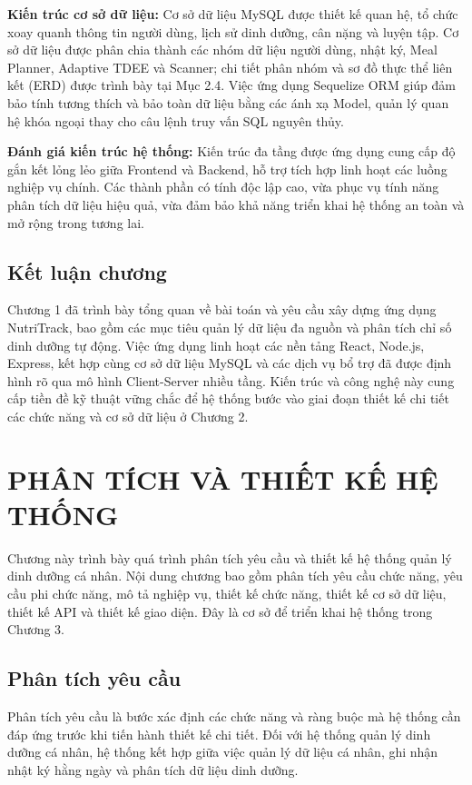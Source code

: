 \documentclass[12pt, a4paper]{report}
\begin{document}
\textbf{Kiến trúc cơ sở dữ liệu:} Cơ sở dữ liệu MySQL được thiết kế quan hệ, tổ chức xoay quanh thông tin người dùng, lịch sử dinh dưỡng, cân nặng và luyện tập. Cơ sở dữ liệu được phân chia thành các nhóm dữ liệu người dùng, nhật ký, Meal Planner, Adaptive TDEE và Scanner; chi tiết phân nhóm và sơ đồ thực thể liên kết (ERD) được trình bày tại Mục 2.4. Việc ứng dụng Sequelize ORM giúp đảm bảo tính tương thích và bảo toàn dữ liệu bằng các ánh xạ Model, quản lý quan hệ khóa ngoại thay cho câu lệnh truy vấn SQL nguyên thủy.

\textbf{Đánh giá kiến trúc hệ thống:} Kiến trúc đa tầng được ứng dụng cung cấp độ gắn kết lỏng lẻo giữa Frontend và Backend, hỗ trợ tích hợp linh hoạt các luồng nghiệp vụ chính. Các thành phần có tính độc lập cao, vừa phục vụ tính năng phân tích dữ liệu hiệu quả, vừa đảm bảo khả năng triển khai hệ thống an toàn và mở rộng trong tương lai.

\section{Kết luận chương}
Chương 1 đã trình bày tổng quan về bài toán và yêu cầu xây dựng ứng dụng NutriTrack, bao gồm các mục tiêu quản lý dữ liệu đa nguồn và phân tích chỉ số dinh dưỡng tự động. Việc ứng dụng linh hoạt các nền tảng React, Node.js, Express, kết hợp cùng cơ sở dữ liệu MySQL và các dịch vụ bổ trợ đã được định hình rõ qua mô hình Client-Server nhiều tầng. Kiến trúc và công nghệ này cung cấp tiền đề kỹ thuật vững chắc để hệ thống bước vào giai đoạn thiết kế chi tiết các chức năng và cơ sở dữ liệu ở Chương 2.

\chapter{PHÂN TÍCH VÀ THIẾT KẾ HỆ THỐNG}
Chương này trình bày quá trình phân tích yêu cầu và thiết kế hệ thống quản lý dinh dưỡng cá nhân. Nội dung chương bao gồm phân tích yêu cầu chức năng, yêu cầu phi chức năng, mô tả nghiệp vụ, thiết kế chức năng, thiết kế cơ sở dữ liệu, thiết kế API và thiết kế giao diện. Đây là cơ sở để triển khai hệ thống trong Chương 3.

\section{Phân tích yêu cầu}
Phân tích yêu cầu là bước xác định các chức năng và ràng buộc mà hệ thống cần đáp ứng trước khi tiến hành thiết kế chi tiết. Đối với hệ thống quản lý dinh dưỡng cá nhân, hệ thống kết hợp giữa việc quản lý dữ liệu cá nhân, ghi nhận nhật ký hằng ngày và phân tích dữ liệu dinh dưỡng.
\end{document}
